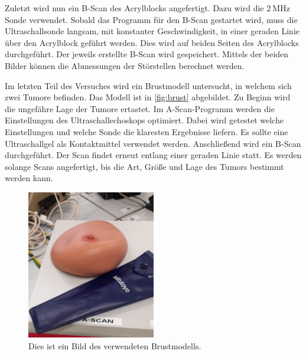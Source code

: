 Zuletzt wird nun ein B-Scan des Acrylblocks angefertigt. Dazu wird die $\qty{2}{\mega\hertz}$ Sonde verwendet. Sobald das Programm für den B-Scan gestartet wird,
muss die Ultraschallsonde langsam, mit konstanter Geschwindigkeit, in einer geraden Linie über den Acrylblock geführt werden. 
Dies wird auf beiden Seiten des Acrylblocks durchgeführt. Der jeweils erstellte B-Scan wird gespeichert.
Mittels der beiden Bilder können die Abmessungen der Störstellen berechnet werden. 

Im letzten Teil des Versuches wird ein Brustmodell untersucht, in welchem sich zwei \glqq Tumore\grqq{} befinden. Das Modell ist in \autoref{fig:brust} abgebildet.
Zu Beginn wird die ungefähre Lage der Tumore ertastet. Im A-Scan-Programm werden die Einstellungen des Ultraschallechoskops optimiert. 
Dabei wird getestet welche Einstellungen und welche Sonde die klaresten Ergebnisse liefern. Es sollte eine Ultraschallgel als Kontaktmittel verwendet werden.
Anschließend wird ein B-Scan durchgeführt. Der Scan findet erneut entlang einer geraden 
Linie statt. Es werden solange Scans angefertigt, bis die Art, Größe und Lage des Tumors bestimmt werden kann.

\begin{figure}
    \centering
	\includegraphics[width=0.5\textwidth]{content/Titte1.jpg}
    \caption{Dies ist ein Bild des verwendeten Brustmodells.}
    \label{fig:brust}
\end{figure}
